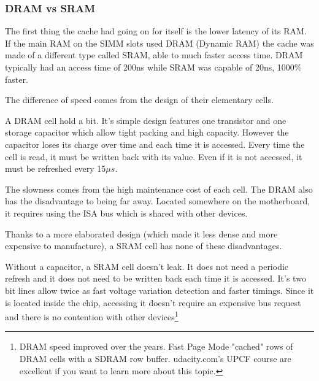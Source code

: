 \subsubsection{DRAM vs SRAM}
The first thing the cache had going on for itself is the lower latency of its RAM. If the main RAM on the SIMM slots used DRAM (Dynamic RAM) the cache was made of a different type called SRAM, able to much faster access time. DRAM typically had an access time of 200ns while SRAM was capable of 20ns, 1000\% faster. \\
\par
The difference of speed comes from the design of their elementary cells.\\
\par
 A DRAM cell hold a bit. It's simple design features one transistor and one storage capacitor which allow tight packing and high capacity. However the capacitor loses its charge over time and each time it is accessed. Every time the cell is read, it must be written back with its value. Even if it is not accessed, it must be refreshed every 15$\mu s$.\\
\par
{}
\vspace{-5pt}
The slowness comes from the high maintenance cost of each cell. The DRAM also has the disadvantage to being far away. Located somewhere on the motherboard, it requires using the ISA bus which is shared with other devices.\\
\par

\vspace{2mm}
Thanks to a more elaborated design (which made it less dense and more expensive to manufacture), a SRAM cell has none of these disadvantages.\\
\par
{}
\par
Without a capacitor, a SRAM cell doesn't leak. It does not need a periodic refresh and it does not need to be written back each time it is accessed. It's two bit lines allow twice as fast voltage variation detection and faster timings.
Since it is located inside the chip, accessing it doesn't require an expensive bus request and there is no contention with other devices\footnote{DRAM speed improved over the years. Fast Page Mode "cached" rows of DRAM cells with a SDRAM row buffer. udacity.com's UPCF course are excellent if you want to learn more about this topic.}
\par










